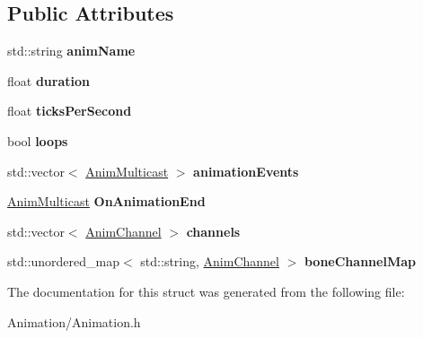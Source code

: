 \subsection*{Public Attributes}
\begin{DoxyCompactItemize}
\item 
\mbox{\label{structAnimation_a0447169235a9232787743cd944752b3f}} 
std\+::string {\bfseries anim\+Name}
\item 
\mbox{\label{structAnimation_a66cc7333638f071b0401072ba95c55fd}} 
float {\bfseries duration}
\item 
\mbox{\label{structAnimation_a929555773b65c756af1519fc39317560}} 
float {\bfseries ticks\+Per\+Second}
\item 
\mbox{\label{structAnimation_aad5027023051d9891c36539a27e2df3d}} 
bool {\bfseries loops}
\item 
\mbox{\label{structAnimation_a20f3a503b821838808d517a2230c4b94}} 
std\+::vector$<$ \hyperlink{classMulticast}{Anim\+Multicast} $>$ {\bfseries animation\+Events}
\item 
\mbox{\label{structAnimation_aa5cccbaad84b1541e823c2f4ef88c15b}} 
\hyperlink{classMulticast}{Anim\+Multicast} {\bfseries On\+Animation\+End}
\item 
\mbox{\label{structAnimation_a929158d26b6d71f1d297820625e46fc7}} 
std\+::vector$<$ \hyperlink{structAnimChannel}{Anim\+Channel} $>$ {\bfseries channels}
\item 
\mbox{\label{structAnimation_ab0ec7a6ccca71fc844b62e2309a7a539}} 
std\+::unordered\+\_\+map$<$ std\+::string, \hyperlink{structAnimChannel}{Anim\+Channel} $>$ {\bfseries bone\+Channel\+Map}
\end{DoxyCompactItemize}


The documentation for this struct was generated from the following file\+:\begin{DoxyCompactItemize}
\item 
Animation/Animation.\+h\end{DoxyCompactItemize}

